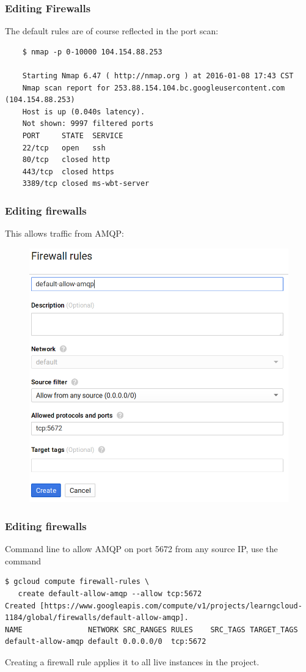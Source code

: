 \documentclass[9pt]{beamer}
\begin{document}
\begin{frame}[fragile]
  \frametitle{Editing Firewalls}
  The default rules are of course reflected in the port scan:
  \begin{verbatim}
    $ nmap -p 0-10000 104.154.88.253

    Starting Nmap 6.47 ( http://nmap.org ) at 2016-01-08 17:43 CST
    Nmap scan report for 253.88.154.104.bc.googleusercontent.com (104.154.88.253)
    Host is up (0.040s latency).
    Not shown: 9997 filtered ports
    PORT     STATE  SERVICE
    22/tcp   open   ssh
    80/tcp   closed http
    443/tcp  closed https
    3389/tcp closed ms-wbt-server
  \end{verbatim}
\end{frame}

\begin{frame}[fragile]
  \frametitle{Editing firewalls}
  This allows traffic from AMQP:
  \begin{figure}
    \includegraphics[scale=0.2]{figures/DefineFirewall.png}
  \end{figure}
\end{frame}

\begin{frame}[fragile]
  \frametitle{Editing firewalls}
  Command line to allow AMQP on port 5672 from any source IP, use the command
\begin{verbatim}
$ gcloud compute firewall-rules \ 
   create default-allow-amqp --allow tcp:5672
Created [https://www.googleapis.com/compute/v1/projects/learngcloud-1184/global/firewalls/default-allow-amqp].
NAME               NETWORK SRC_RANGES RULES    SRC_TAGS TARGET_TAGS
default-allow-amqp default 0.0.0.0/0  tcp:5672
\end{verbatim}
  Creating a firewall rule applies it to all live instances in the project.
\end{frame}
\end{document}
